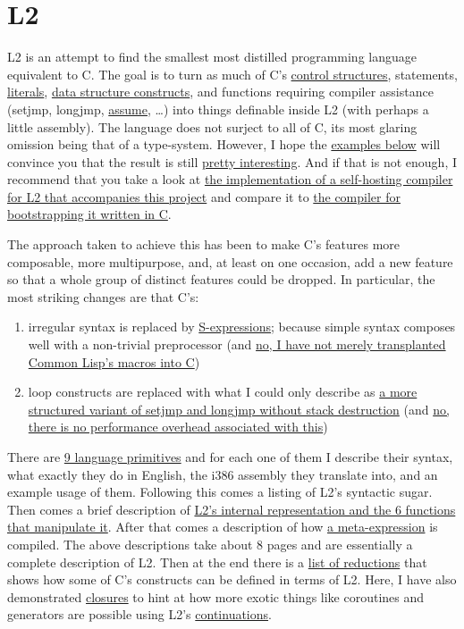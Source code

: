 \documentclass[]{article}
\date{}
\providecommand{\tightlist}{%
  \setlength{\itemsep}{0pt}\setlength{\parskip}{0pt}}
\begin{document}
\section{L2}\label{l2}

L2 is an attempt to find the smallest most distilled programming
language equivalent to C. The goal is to turn as much of C's
\protect\hyperlink{switch-expression}{control structures}, statements,
\protect\hyperlink{strings}{literals}, \protect\hyperlink{fields}{data
structure constructs}, and functions requiring compiler assistance
(setjmp, longjmp, \protect\hyperlink{assume}{assume}, \ldots{}) into
things definable inside L2 (with perhaps a little assembly). The
language does not surject to all of C, its most glaring omission being
that of a type-system. However, I hope the
\protect\hyperlink{examplesreductions}{examples below} will convince you
that the result is still \protect\hyperlink{closures}{pretty
interesting}. And if that is not enough, I recommend that you take a
look at \href{src/compile.l2}{the implementation of a self-hosting
compiler for L2 that accompanies this project} and compare it to
\href{bootstrap/compile.c}{the compiler for bootstrapping it written in
C}.

The approach taken to achieve this has been to make C's features more
composable, more multipurpose, and, at least on one occasion, add a new
feature so that a whole group of distinct features could be dropped. In
particular, the most striking changes are that C's:

\begin{enumerate}
\tightlist
\item
  irregular syntax is replaced by
  \protect\hyperlink{internal-representation}{S-expressions}; because
  simple syntax composes well with a non-trivial preprocessor (and
  \protect\hyperlink{expression}{no, I have not merely transplanted
  Common Lisp's macros into C})
\item
  loop constructs are replaced with what I could only describe as
  \protect\hyperlink{with}{a more structured variant of setjmp and
  longjmp without stack destruction} (and
  \protect\hyperlink{an-optimization}{no, there is no performance
  overhead associated with this})
\end{enumerate}

There are \protect\hyperlink{expressions}{9 language primitives} and for
each one of them I describe their syntax, what exactly they do in
English, the i386 assembly they translate into, and an example usage of
them. Following this comes a listing of L2's syntactic sugar. Then comes
a brief description of \protect\hyperlink{internal-representation}{L2's
internal representation and the 6 functions that manipulate it}. After
that comes a description of how \protect\hyperlink{meta}{a
meta-expression} is compiled. The above descriptions take about 8 pages
and are essentially a complete description of L2. Then at the end there
is a \protect\hyperlink{examplesreductions}{list of reductions} that
shows how some of C's constructs can be defined in terms of L2. Here, I
have also demonstrated \protect\hyperlink{closures}{closures} to hint at
how more exotic things like coroutines and generators are possible using
L2's \protect\hyperlink{jump}{continuations}.
\end{document}
